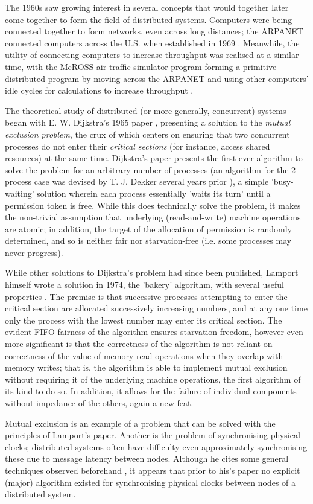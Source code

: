 \documentclass[11pt]{article}
\begin{document}
The 1960s saw growing interest in several concepts that would together later
come together to form the field of distributed systems. Computers were being
connected together to form networks, even across long distances; the
ARPANET connected computers across the U.S. when established in 1969
\cite{hauben2007history}. Meanwhile, the utility of connecting computers to
increase throughput was realised at a similar time, with the McROSS air-traffic
simulator program forming a primitive distributed program by moving across the
ARPANET and using other computers' idle cycles for calculations to increase
throughput \cite{Thomas1971mcROSSAM}. 
\par
The theoretical study of distributed (or more generally, concurrent) systems
began with E. W.  Dijkstra's 1965 paper \cite{dijkstra1965solution}, presenting a
solution to the \textit{mutual exclusion problem}, the crux of which centers on
ensuring that two concurrent processes do not enter their \textit{critical
sections} (for instance, access shared resources) at the same time. Dijkstra's
paper presents the first ever algorithm to solve the problem for an arbitrary
number of processes (an algorithm for the 2-process case was devised by T. J.
Dekker several years prior \cite{dijkstra1968cooperating}), a simple
'busy-waiting' solution wherein each process essentially 'waits its turn' until
a permission token is free. While this does technically solve the problem, it
makes the non-trivial assumption that underlying (read-and-write) machine
operations are atomic; in addition, the target of the allocation of permission
is randomly determined, and so is neither fair nor starvation-free (i.e. some
processes may never progress).
\par
While other solutions to Dijkstra's problem had since been published, Lamport
himself wrote a solution in 1974, the 'bakery' algorithm, with several useful
properties \cite{lamport1974new}. The premise is that successive processes
attempting to enter the critical section are allocated successively increasing
numbers, and at any one time only the process with the lowest number may enter
its critical section. The evident FIFO fairness of the algorithm ensures
starvation-freedom, however even more significant is that the correctness of the
algorithm is not reliant on correctness of the value of memory read operations
when they overlap with memory writes; that is, the algorithm is able to
implement mutual exclusion without requiring it of the underlying machine
operations, the first algorithm of its kind to do so. In addition, it allows for
the failure of individual components without impedance of the others, again a
new feat.
\par
Mutual exclusion is an example of a problem that can be solved with the
principles of Lamport's paper. Another is the problem of synchronising physical
clocks; distributed systems often have difficulty even approximately
synchronising these due to message latency between nodes. Although he cites some
general techniques observed beforehand \cite{ellingson1973dissemination}, it
appears that prior to his's paper no explicit (major) algorithm existed for
synchronising physical clocks between nodes of a distributed system.
\end{document}
